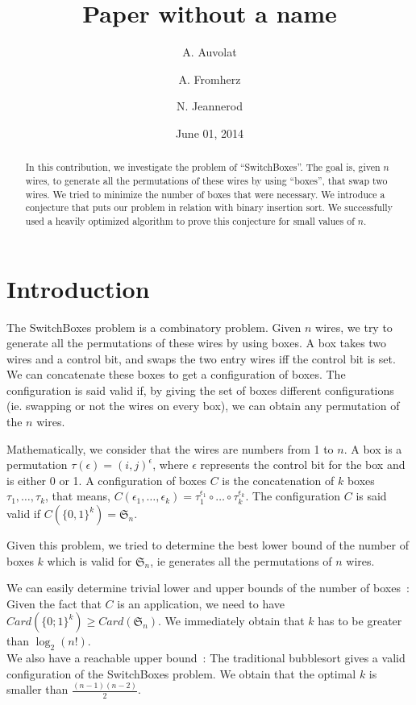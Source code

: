 \documentclass[11pt, a4paper]{article}
\begin{document}
\title{ Paper without a name }
\author{A. Auvolat \and A. Fromherz \and N. Jeannerod }
\date{June 01, 2014}
\maketitle

\begin{abstract}

In this contribution, we investigate the problem of ``SwitchBoxes''.  The goal is,
given $n$ wires, to generate all the permutations of these wires by using
``boxes'', that swap two wires. We tried to minimize the number of boxes that were
necessary.  We introduce a conjecture that puts our problem in relation with
binary insertion sort.  We successfully used a heavily optimized algorithm to
prove this conjecture for small values of $n$.

\end{abstract}

\section{Introduction}

The SwitchBoxes problem is a combinatory problem. Given $n$ wires, we try to
generate all the permutations of these wires by using boxes.  A box takes two
wires and a control bit, and swaps the two entry wires iff the control bit is
set. We can concatenate these boxes to get a configuration of boxes.  The
configuration is said valid if, by giving the set of boxes different
configurations (ie. swapping or not the wires on every box), we can obtain any
permutation of the $n$ wires.

Mathematically, we consider that the wires are numbers from 1 to $n$. A box is a
permutation $\tau(\epsilon) = (i,j)^{\epsilon}$, where $\epsilon$ represents the
control bit for the box and is either 0 or 1.  A configuration of boxes $C$ is
the concatenation of $k$ boxes $\tau_1, \ldots, \tau_k$, that means,
$C(\epsilon_1, \ldots, \epsilon_k) =
\tau_1^{\epsilon_1}\circ\ldots\circ\tau_k^{\epsilon_k}$.  The configuration $C$
is said valid if $C(\{0,1\}^k)= \mathfrak{S}_n$.

Given this problem, we tried to determine the best lower bound of the number of
boxes $k$ which is valid for $\mathfrak{S}_n$, ie generates all the permutations of $n$
wires.

We can easily determine trivial lower and upper bounds of the number of
boxes~:\\ Given the fact that $C$ is an application, we need to have
$Card(\{0;1\}^{k}) \geq Card(\mathfrak{S}_n)$. We immediately obtain that $k$
has to be greater than $\log_2(n!)$.\\ We also have a reachable upper bound~: The
traditional bubblesort gives a valid configuration of the SwitchBoxes problem. We
obtain that the optimal $k$ is smaller than $\frac{(n-1)(n-2)}{2}$.
\end{document}

